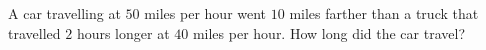 A car travelling at $50$ miles per hour went $10$ miles farther than a truck that travelled $2$ hours longer at $40$ miles per hour. How long did the car travel?
